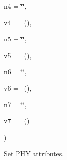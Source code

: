{\begin{DoxyParamCaption}
\item[{std\+::string}]{n4 = {\ttfamily \char`\"{}\char`\"{}}, }
\item[{const {\bf Attribute\+Value} \&}]{v4 = {~()}, }
\item[{std\+::string}]{n5 = {\ttfamily \char`\"{}\char`\"{}}, }
\item[{const {\bf Attribute\+Value} \&}]{v5 = {~()}, }
\item[{std\+::string}]{n6 = {\ttfamily \char`\"{}\char`\"{}}, }
\item[{const {\bf Attribute\+Value} \&}]{v6 = {~()}, }
\item[{std\+::string}]{n7 = {\ttfamily \char`\"{}\char`\"{}}, }
\item[{const {\bf Attribute\+Value} \&}]{v7 = {~()}}
\end{DoxyParamCaption}
)}\hypertarget{classns3_1_1UanHelper_a4435a01bab4cf4d0043b3c2b811ab487}{}\label{classns3_1_1UanHelper_a4435a01bab4cf4d0043b3c2b811ab487}
Set P\+HY attributes.


